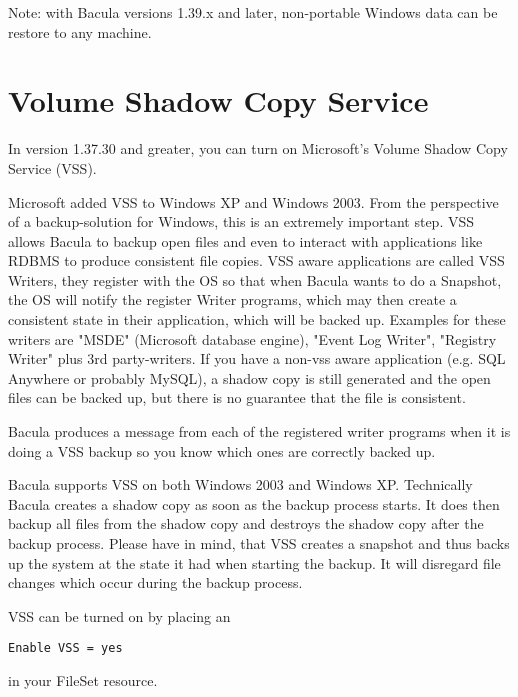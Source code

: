 Note: with Bacula versions 1.39.x and later, non-portable Windows data can
be restore to any machine.


\label{VSS}
\section{Volume Shadow Copy Service}
In version 1.37.30 and greater, you can turn on Microsoft's Volume
Shadow Copy Service (VSS).      

Microsoft added VSS to Windows XP and Windows 2003. From the perspective of
a backup-solution for Windows, this is an extremely important step. VSS
allows Bacula to backup open files and even to interact with applications like
RDBMS to produce consistent file copies. VSS aware applications are called
VSS Writers, they register with the OS so that when Bacula wants to do a
Snapshot, the OS will notify the register Writer programs, which may then
create a consistent state in their application, which will be backed up.
Examples for these writers are "MSDE" (Microsoft database
engine), "Event Log Writer", "Registry Writer" plus 3rd
party-writers.  If you have a non-vss aware application (e.g.
SQL Anywhere or probably MySQL), a shadow copy is still generated
and the open files can be backed up, but there is no guarantee
that the file is consistent.

Bacula produces a message from each of the registered writer programs
when it is doing a VSS backup so you know which ones are correctly backed
up.

Bacula supports VSS on both Windows 2003 and Windows XP.
Technically Bacula creates a shadow copy as soon as the backup process
starts. It does then backup all files from the shadow copy and destroys the
shadow copy after the backup process. Please have in mind, that VSS
creates a snapshot and thus backs up the system at the state it had
when starting the backup. It will disregard file changes which occur during
the backup process.

VSS can be turned on by placing an

\begin{verbatim}
Enable VSS = yes
\end{verbatim}

in your FileSet resource. 

